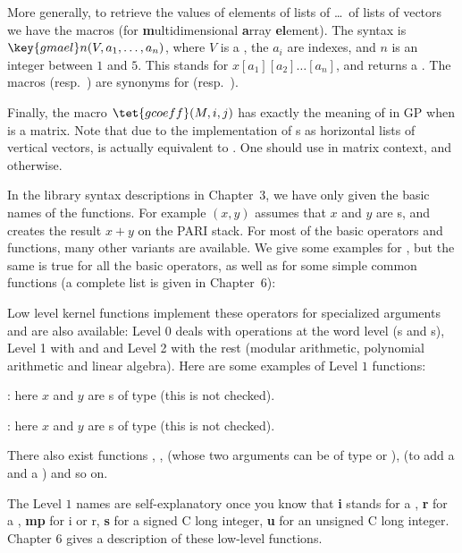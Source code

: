 More generally, to retrieve the values of elements of lists of \dots\ of
lists of vectors we have the  macros (for {\bf m}ultidimensional
{\bf a}rray {\bf el}ement). The syntax is $\key{gmael}n(V,a_1,\dots,a_n)$,
where $V$ is a , the $a_i$ are indexes, and $n$ is an integer
between $1$ and $5$. This stands for $x[a_1][a_2]\dots[a_n]$, and returns a
. The macros  (resp.~) are synonyms for
 (resp.~).

Finally, the macro $\tet{gcoeff}(M, i, j)$ has exactly the meaning of
 in GP when  is a matrix. Note that due to the
implementation of s as horizontal lists of vertical vectors,
 is actually equivalent to . One should use
 in matrix context, and  otherwise.

\label{se:low_level} In the library
syntax descriptions in Chapter~3, we have only given the basic names of the
functions. For example $(x,y)$ assumes that $x$ and $y$ are
s, and creates the result $x+y$ on the PARI stack. For most
of the basic operators and functions, many other variants are available. We
give some examples for , but the same is true for all the basic
operators, as well as for some simple common functions (a complete list
is given in Chapter~6):



Low level kernel functions implement these operators for specialized
arguments and are also available: Level 0 deals with operations at the word
level (s and s), Level 1 with  and 
and Level 2 with the rest (modular arithmetic, polynomial arithmetic and
linear algebra). Here are some examples of Level $1$ functions:

: here $x$ and $y$ are s of type
 (this is not checked).

: here $x$ and $y$ are s of
type  (this is not checked).

\noindent
There also exist functions , ,  (whose
two arguments can be of type  or ),  (to add a
 and a ) and so on.

The Level $1$ names are self-explanatory once you know that {\bf i} stands for a
, {\bf r} for a , {\bf mp} for i or r, {\bf s} for a signed C
long integer, {\bf u} for an unsigned C long integer. Chapter 6 gives a
description of these low-level functions.

